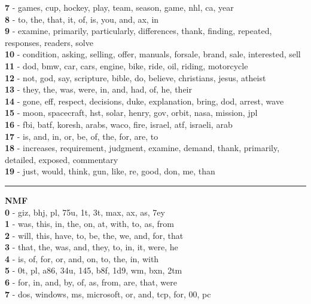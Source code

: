 \textbf{7} - games, cup, hockey, play, team, season, game, nhl, ca, year\\
\textbf{8} - to, the, that, it, of, is, you, and, ax, in\\
\textbf{9} - examine, primarily, particularly, differences, thank, finding, repeated, responses, readers, solve\\
\textbf{10} - condition, asking, selling, offer, manuals, forsale, brand, sale, interested, sell\\
\textbf{11} - dod, bmw, car, cars, engine, bike, ride, oil, riding, motorcycle\\
\textbf{12} - not, god, say, scripture, bible, do, believe, christians, jesus, atheist\\
\textbf{13} - they, the, was, were, in, and, had, of, he, their\\
\textbf{14} - gone, eff, respect, decisions, duke, explanation, bring, dod, arrest, wave\\
\textbf{15} - moon, spacecraft, hst, solar, henry, gov, orbit, nasa, mission, jpl\\
\textbf{16} - fbi, batf, koresh, arabs, waco, fire, israel, atf, israeli, arab\\
\textbf{17} - is, and, in, or, be, of, the, for, are, to\\
\textbf{18} - increases, requirement, judgment, examine, demand, thank, primarily, detailed, exposed, commentary\\
\textbf{19} - just, would, think, gun, like, re, good, don, me, than\\
\hrule\vspace{2mm}
\noindent
\textbf{NMF}\vspace{2mm}\\
\vspace{2mm}
\noindent
\textbf{0} - giz, bhj, pl, 75u, 1t, 3t, max, ax, as, 7ey\\
\textbf{1} - was, this, in, the, on, at, with, to, as, from\\
\textbf{2} - will, this, have, to, be, the, we, and, for, that\\
\textbf{3} - that, the, was, and, they, to, in, it, were, he\\
\textbf{4} - is, of, for, or, and, on, to, the, in, with\\
\textbf{5} - 0t, pl, a86, 34u, 145, b8f, 1d9, wm, bxn, 2tm\\
\textbf{6} - for, in, and, by, of, as, from, are, that, were\\
\textbf{7} - dos, windows, ms, microsoft, or, and, tcp, for, 00, pc\\
